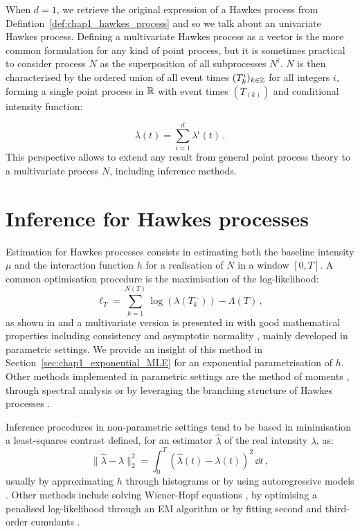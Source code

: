 When $d=1$, we retrieve the original expression of a Hawkes process from Defintion~\ref{def:chap1_hawkes_process} and so we talk about an univariate Hawkes process. 
Defining a multivariate Hawkes process as a vector is the more common formulation for any kind of point process, but it is sometimes practical to consider process $N$ as the superposition of all subprocesses $N^i$.
$N$ is then characterised by the ordered union of all event times $(T_k^i)_{k\in{\mathbb Z}}$ for all integers $i$, forming a single point process in ${\mathbb R}$ with event times $(T_{(k)})$ and conditional intensity function:

\[\lambda(t) = \sum_{i=1}^{d}{\lambda^i(t)}\,.\]
This perspective allows to extend any result from general point process theory to a multivariate process $N$, including inference methods.


\section{Inference for Hawkes processes}\label{sec:chap1_inference}

Estimation for Hawkes processes consists in estimating both the baseline intensity $\mu$ and the interaction function $h$ for a realisation of $N$ in a window $[0,T]$.
A common optimisation procedure is the maximisation of the log-likelihood:
\[\ell_T = \sum_{k=1}^{N(T)}{\log(\lambda(T_k^-))} - \Lambda(T)\,,\]
as shown in \textcite{Ozaki1979} and a multivariate version is presented in \textcite{Embrechts2011, Guo2018} with good mathematical properties including consistency and asymptotic normality \parencite{Clinet2017}, mainly developed in parametric settings.
We provide an insight of this method in Section~\ref{sec:chap1_exponential_MLE} for an exponential parametrisation of $h$.
Other methods implemented in parametric settings are the method of moments \parencite{DaFonseca2013}, through spectral analysis \parencite{Adamopoulos1976} or by leveraging the branching structure of Hawkes processes \parencite{Veen2008}.

Inference procedures in non-parametric settings tend to be based in minimisation a least-squares contrast defined, for an estimator $\hat \lambda$ of the real intensity $\lambda$, as:
\[\|\hat \lambda - \lambda\|_2^2 = \int_{0}^{T}{(\hat\lambda(t) - \lambda(t))^2\,\dd t}\,,\]
usually by approximating $h$ through histograms \parencite{Lemonnier2014, Reynaud2014} or by using autoregressive models \parencite{Kirchner2017}. Other methods include solving Wiener-Hopf equations \parencite{Bacry2016}, by optimising a penalised log-likelihood through an EM algorithm \parencite{Lewis2011} or by fitting second and third-order cumulants \parencite{Achab2016}. 

